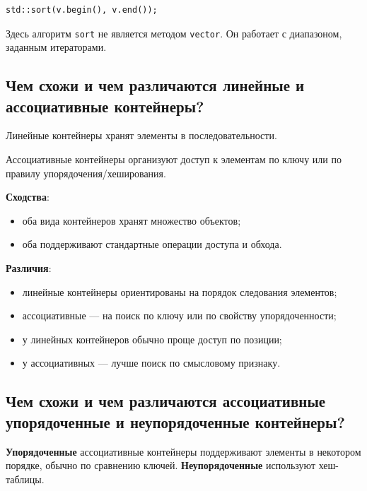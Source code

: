\begin{example}
\begin{verbatim}
std::sort(v.begin(), v.end());
\end{verbatim}
\end{example}

Здесь алгоритм \texttt{sort} не является методом \texttt{vector}. Он работает с диапазоном, заданным итераторами.

\subsection{Чем схожи и чем различаются линейные и ассоциативные контейнеры?}
\begin{definition}
Линейные контейнеры хранят элементы в последовательности.
\end{definition}

\begin{definition}
Ассоциативные контейнеры организуют доступ к элементам по ключу или по правилу упорядочения/хеширования.
\end{definition}

\textbf{Сходства}:
\begin{itemize}
    \item оба вида контейнеров хранят множество объектов;
    \item оба поддерживают стандартные операции доступа и обхода.
\end{itemize}

\textbf{Различия}:
\begin{itemize}
    \item линейные контейнеры ориентированы на порядок следования элементов;
    \item ассоциативные — на поиск по ключу или по свойству упорядоченности;
    \item у линейных контейнеров обычно проще доступ по позиции;
    \item у ассоциативных — лучше поиск по смысловому признаку.
\end{itemize}

\subsection{Чем схожи и чем различаются ассоциативные упорядоченные и неупорядоченные контейнеры?}
\textbf{Упорядоченные} ассоциативные контейнеры поддерживают элементы в некотором порядке, обычно по сравнению ключей.  
\textbf{Неупорядоченные} используют хеш-таблицы.

